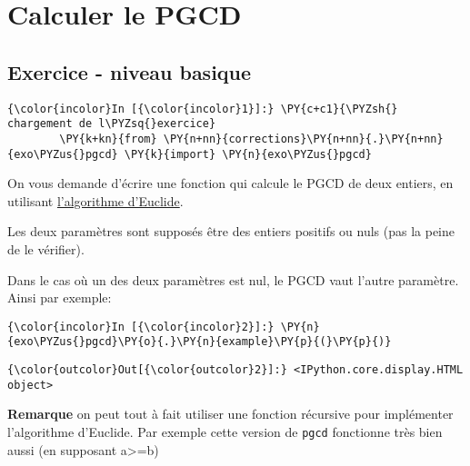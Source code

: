    
    
    
    

    

    \hypertarget{calculer-le-pgcd}{%
\section{Calculer le PGCD}\label{calculer-le-pgcd}}

    \hypertarget{exercice---niveau-basique}{%
\subsection{Exercice - niveau basique}\label{exercice---niveau-basique}}

    \begin{Verbatim}[commandchars=\\\{\},frame=single,framerule=0.3mm,rulecolor=\color{cellframecolor}]
{\color{incolor}In [{\color{incolor}1}]:} \PY{c+c1}{\PYZsh{} chargement de l\PYZsq{}exercice}
        \PY{k+kn}{from} \PY{n+nn}{corrections}\PY{n+nn}{.}\PY{n+nn}{exo\PYZus{}pgcd} \PY{k}{import} \PY{n}{exo\PYZus{}pgcd}
\end{Verbatim}


    On vous demande d'écrire une fonction qui calcule le PGCD de deux
entiers, en utilisant
\href{http://fr.wikipedia.org/wiki/Algorithme_d'Euclide}{l'algorithme
d'Euclide}.

    Les deux paramètres sont supposés être des entiers positifs ou nuls (pas
la peine de le vérifier).

Dans le cas où un des deux paramètres est nul, le PGCD vaut l'autre
paramètre. Ainsi par exemple:

    \begin{Verbatim}[commandchars=\\\{\},frame=single,framerule=0.3mm,rulecolor=\color{cellframecolor}]
{\color{incolor}In [{\color{incolor}2}]:} \PY{n}{exo\PYZus{}pgcd}\PY{o}{.}\PY{n}{example}\PY{p}{(}\PY{p}{)}
\end{Verbatim}


\begin{Verbatim}[commandchars=\\\{\},frame=single,framerule=0.3mm,rulecolor=\color{cellframecolor}]
{\color{outcolor}Out[{\color{outcolor}2}]:} <IPython.core.display.HTML object>
\end{Verbatim}
            
    \textbf{Remarque} on peut tout à fait utiliser une fonction récursive
pour implémenter l'algorithme d'Euclide. Par exemple cette version de
\texttt{pgcd} fonctionne très bien aussi (en supposant
a\textgreater{}=b)

